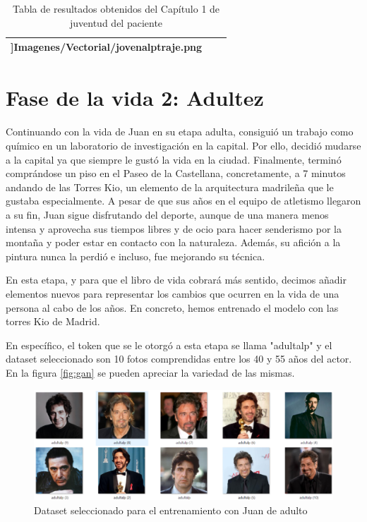 \begin{table}
\begin{tabular}{>{\centering\arraybackslash}m{5cm} >{\arraybackslash}m{5cm}>{\arraybackslash}m{5cm}}
 		\textwidth]{Imagenes/Vectorial/jovenalptraje.png}\\
 		\hline
 	\end{tabular}
 	\caption{Tabla de resultados obtenidos del Capítulo 1 de juventud del paciente}
 	\label{tab:capitulo1librovida}
 \end{table}


\section{Fase de la vida 2: Adultez}
Continuando con la vida de Juan en su etapa adulta, consiguió un trabajo como químico en un laboratorio de investigación en la capital. Por ello, decidió mudarse a la capital ya que siempre le gustó la vida en la ciudad. Finalmente, terminó comprándose un piso en el Paseo de la Castellana, concretamente, a 7 minutos andando de las Torres Kio, un elemento de la arquitectura madrileña que le gustaba especialmente. A pesar de que sus años en el equipo de atletismo llegaron a su fin, Juan sigue disfrutando del deporte, aunque de una manera menos intensa y aprovecha sus tiempos libres y de ocio para hacer senderismo por la montaña y poder estar en contacto con la naturaleza. Además, su afición a la pintura nunca la perdió e incluso, fue mejorando su técnica.  

En esta etapa, y para que el libro de vida cobrará más sentido, decimos añadir elementos nuevos para representar los cambios que ocurren en la vida de una persona al cabo de los años. En concreto, hemos entrenado el modelo con las torres Kio de Madrid.

En específico, el token que se le otorgó a esta etapa se llama "adultalp" y el dataset seleccionado son 10 fotos comprendidas entre los 40 y 55 años del actor. En la figura \ref{fig:gan} se pueden apreciar la variedad de las mismas. 

\begin{figure}[!htb]
	\centering
	\includegraphics[width = 1
	\textwidth]{Imagenes/Vectorial/dataset_adultalp.png}
	\caption{Dataset seleccionado para el entrenamiento con Juan de adulto}
	\label{fig:datasetadultalp}
\end{figure}

